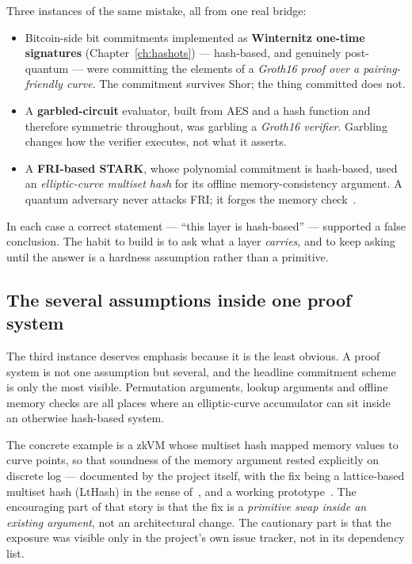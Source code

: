 Three instances of the same mistake, all from one real bridge:
\begin{itemize}
  \item Bitcoin-side bit commitments implemented as \textbf{Winternitz one-time
        signatures} (Chapter~\ref{ch:hashots}) --- hash-based, and genuinely
        post-quantum --- were committing the elements of a \emph{Groth16 proof
        over a pairing-friendly curve}. The commitment survives Shor; the thing
        committed does not.
  \item A \textbf{garbled-circuit} evaluator, built from AES and a hash
        function and therefore symmetric throughout, was garbling a
        \emph{Groth16 verifier}. Garbling changes how the verifier executes, not
        what it asserts.
  \item A \textbf{FRI-based STARK}, whose polynomial commitment is hash-based,
        used an \emph{elliptic-curve multiset hash} for its offline
        memory-consistency argument. A quantum adversary never attacks FRI; it
        forges the memory check~\cite{ziren276}.
\end{itemize}

In each case a correct statement --- ``this layer is hash-based'' --- supported a
false conclusion. The habit to build is to ask what a layer \emph{carries}, and
to keep asking until the answer is a hardness assumption rather than a
primitive.

\subsection{The several assumptions inside one proof system}
The third instance deserves emphasis because it is the least obvious. A proof
system is not one assumption but several, and the headline commitment scheme is
only the most visible. Permutation arguments, lookup arguments and offline
memory checks are all places where an elliptic-curve accumulator can sit inside
an otherwise hash-based system.

The concrete example is a zkVM whose multiset hash mapped memory values to
curve points, so that soundness of the memory argument rested explicitly on
discrete log --- documented by the project itself, with the fix being a
lattice-based multiset hash (LtHash) in the sense of~\cite{zisklthash}, and a
working prototype~\cite{ziren276}. The encouraging part of that story is that
the fix is a \emph{primitive swap inside an existing argument}, not an
architectural change. The cautionary part is that the exposure was visible only
in the project's own issue tracker, not in its dependency list.

